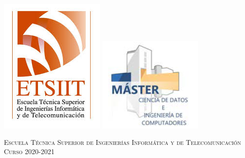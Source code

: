 \begin{titlepage}
\begin{minipage}{\textwidth}
        \includegraphics[scale=0.3]{img/etsiit.jpeg}
        \includegraphics[scale=0.6]{img/master.png}

        \vspace{0.7cm}
        \textsc{Escuela Técnica Superior de Ingenierías Informática y de Telecomunicación}\\
        \vspace{1cm}
        \textsc{Curso 2020-2021}
    \end{minipage}
\end{titlepage}
